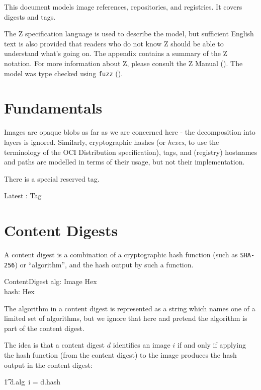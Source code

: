 \documentclass[a4paper,twoside,12pt]{article}
\begin{document}
This document models image references, repositories, and registries. It covers digests and tags.

The Z specification language is used to describe the model, but sufficient English text is also provided that readers who do not know Z should be able to understand what's going on. The appendix contains a summary of the Z notation.
For more information about Z, please consult the Z Manual (\cite{zman}).
The model was type checked using \texttt{fuzz} (\cite{fuzz}).

\section{Fundamentals}

Images are opaque blobs as far as we are concerned here - the decomposition into layers is ignored.
Similarly, cryptographic hashes (or \textit{hexes}, to use the terminology of the OCI Distribution specification), tags, and (registry) hostnames and paths are modelled in terms of their usage, but not their implementation.
\begin{zed}
\end{zed}

There is a special reserved tag.
\begin{axdef}
    Latest : Tag
\end{axdef}

\newpage
\section{Content Digests}

A content digest is a combination of a cryptographic hash function (such as \texttt{SHA-256}) or ``algorithm'', and the hash output by such a function. 
\begin{schema}{ContentDigest}
    alg: Image \fun Hex \\
    hash: Hex \\ 
\end{schema}
The algorithm in a content digest is represented as a string which names one of a limited set of algorithms, but we ignore that here
and pretend the algorithm is part of the content digest.

The idea is that a content digest $d$ identifies an image $i$ if and only if applying the hash function (from the content digest) to the image produces the hash output in the content digest:\\
\begin{zed}
\t1 d.alg~i = d.hash
\end{zed}
\end{document}
